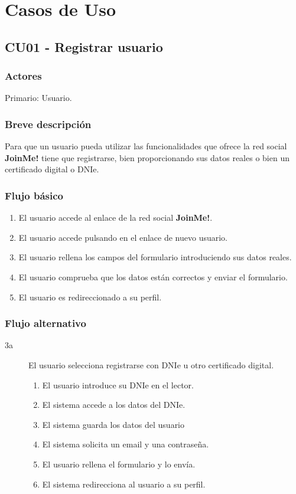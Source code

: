 \documentclass[12pt, a4paper, titlepage]{article}
\begin{document}
\section{Casos de Uso}

\subsection{CU01 - Registrar usuario}
\subsubsection{Actores}
Primario: Usuario.
\subsubsection{Breve descripción}
Para que un usuario pueda utilizar las funcionalidades que ofrece la red social \textbf{JoinMe!} tiene que registrarse, bien proporcionando sus datos reales o bien un certificado digital o DNIe.
\subsubsection{Flujo básico}
\begin{enumerate}
	\item El usuario accede al enlace de la red social \textbf{JoinMe!}.
	\item El usuario accede pulsando en el enlace de nuevo usuario.
	\item El usuario rellena los campos del formulario introduciendo sus datos reales.
	\item El usuario comprueba que los datos están correctos y enviar el formulario.
	\item El usuario es redireccionado a su perfil.
\end{enumerate}
\subsubsection{Flujo alternativo}
\begin{description}
\item [3a] El usuario selecciona registrarse con DNIe u otro certificado digital.
	\begin{enumerate}
		\item El usuario introduce su DNIe en el lector.
		\item El sistema accede a los datos del DNIe.
		\item El sistema guarda los datos del usuario
		\item El sistema solicita un email y una contraseña.
		\item El usuario rellena el formulario y lo envía.
		\item El sistema redirecciona al usuario a su perfil.
	\end{enumerate}
\end{description}
\end{document}
